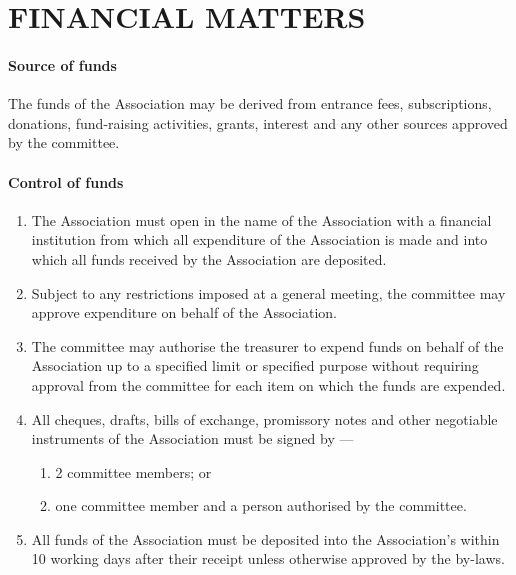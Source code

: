 \documentclass[../constitution.tex]{subfiles}
\begin{document}
\hypertarget{part-7-financial-matters}{%
\part{FINANCIAL MATTERS}\label{part-7-financial-matters}}

\hypertarget{source-of-funds}{%
\subsection{Source of funds}\label{source-of-funds}}

The funds of the Association may be derived from entrance fees, subscriptions, donations, fund-raising activities, grants, interest and any other sources approved by the committee.

\hypertarget{control-of-funds}{%
\subsection{Control of funds}\label{control-of-funds}}

\begin{enumerate}

\item The Association must open  in the name of the Association with a financial institution from which all expenditure of the Association is made and into which all funds received by the Association are deposited.
\item Subject to any restrictions imposed at a general meeting, the committee may approve expenditure on behalf of the Association.
\item The committee may authorise the treasurer to expend funds on behalf of the Association up to a specified limit or specified purpose without requiring approval from the committee for each item on which the funds are expended.
\item All cheques, drafts, bills of exchange, promissory notes and other negotiable instruments of the Association must be signed by ---

  \begin{enumerate}
  
  \item 2 committee members; or
  \item one committee member and a person authorised by the committee.
  \end{enumerate}
\item All funds of the Association must be deposited into the Association's  within 10 working days after their receipt unless otherwise approved by the by-laws.
\end{enumerate}
\end{document}
